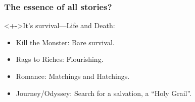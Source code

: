 \begin{frame}

  \frametitle{The essence of all stories?}

  \begin{block}<+->{It's survival---Life and Death:}
    \begin{itemize}
    \item<+->
      Kill the Monster: Bare survival.
    \item<+->
      Rags to Riches: Flourishing.
    \item<+->
      Romance: Matchings and Hatchings.
    \item<+->
      Journey/Odyssey: Search for a salvation, a ``Holy Grail''.
    \end{itemize}
  \end{block}
  
\end{frame}

